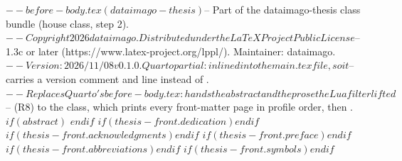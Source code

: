 $-- before-body.tex (dataimago-thesis)
$-- Part of the dataimago-thesis class bundle (house class, step 2).
$-- Copyright 2026 dataimago. Distributed under the LaTeX Project Public License
$-- 1.3c or later (https://www.latex-project.org/lppl/). Maintainer: dataimago.
$-- Version: 2026/11/08 v0.1.0. Quarto partial: inlined into the main .tex file, so it
$-- carries a version comment and \typeout line instead of \ProvidesFile.
$-- Replaces Quarto's before-body.tex: hands the abstract and the prose the Lua filter lifted
$-- (R8) to the class, which prints every front-matter page in profile order, then \mainmatter.
$if(abstract)$
$endif$
$if(thesis-front.dedication)$$endif$
$if(thesis-front.acknowledgments)$$endif$
$if(thesis-front.preface)$$endif$
$if(thesis-front.abbreviations)$$endif$
$if(thesis-front.symbols)$$endif$
\thesisfrontmatter
\mainmatter
